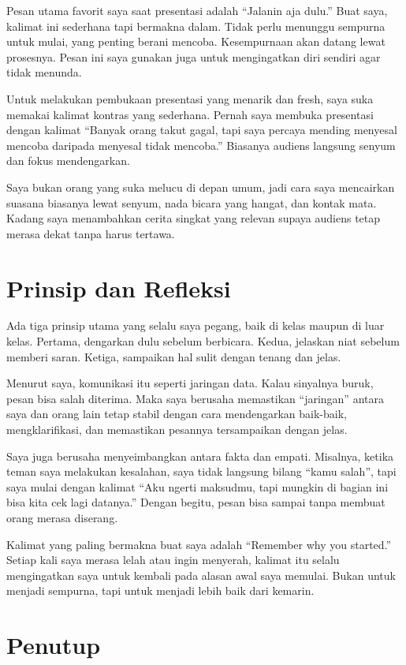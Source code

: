\documentclass[
  letterpaper,
  DIV=11,
  numbers=noendperiod]{scrreprt}
\begin{document}
Pesan utama favorit saya saat presentasi adalah ``Jalanin aja dulu.''
Buat saya, kalimat ini sederhana tapi bermakna dalam. Tidak perlu
menunggu sempurna untuk mulai, yang penting berani mencoba. Kesempurnaan
akan datang lewat prosesnya. Pesan ini saya gunakan juga untuk
mengingatkan diri sendiri agar tidak menunda.

Untuk melakukan pembukaan presentasi yang menarik dan fresh, saya suka
memakai kalimat kontras yang sederhana. Pernah saya membuka presentasi
dengan kalimat ``Banyak orang takut gagal, tapi saya percaya mending
menyesal mencoba daripada menyesal tidak mencoba.'' Biasanya audiens
langsung senyum dan fokus mendengarkan.

Saya bukan orang yang suka melucu di depan umum, jadi cara saya
mencairkan suasana biasanya lewat senyum, nada bicara yang hangat, dan
kontak mata. Kadang saya menambahkan cerita singkat yang relevan supaya
audiens tetap merasa dekat tanpa harus tertawa.

\section{Prinsip dan Refleksi}\label{prinsip-dan-refleksi}

Ada tiga prinsip utama yang selalu saya pegang, baik di kelas maupun di
luar kelas. Pertama, dengarkan dulu sebelum berbicara. Kedua, jelaskan
niat sebelum memberi saran. Ketiga, sampaikan hal sulit dengan tenang
dan jelas.

Menurut saya, komunikasi itu seperti jaringan data. Kalau sinyalnya
buruk, pesan bisa salah diterima. Maka saya berusaha memastikan
``jaringan'' antara saya dan orang lain tetap stabil dengan cara
mendengarkan baik-baik, mengklarifikasi, dan memastikan pesannya
tersampaikan dengan jelas.

Saya juga berusaha menyeimbangkan antara fakta dan empati. Misalnya,
ketika teman saya melakukan kesalahan, saya tidak langsung bilang ``kamu
salah'', tapi saya mulai dengan kalimat ``Aku ngerti maksudmu, tapi
mungkin di bagian ini bisa kita cek lagi datanya.'' Dengan begitu, pesan
bisa sampai tanpa membuat orang merasa diserang.

Kalimat yang paling bermakna buat saya adalah ``Remember why you
started.'' Setiap kali saya merasa lelah atau ingin menyerah, kalimat
itu selalu mengingatkan saya untuk kembali pada alasan awal saya
memulai. Bukan untuk menjadi sempurna, tapi untuk menjadi lebih baik
dari kemarin.

\section{Penutup}\label{penutup}
\end{document}
